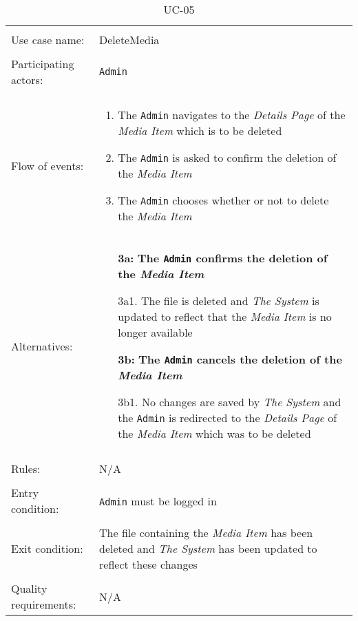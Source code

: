 \noindent
\begin{table}[h!]
\caption{UC-05}
\label{UC-05}
\centering
\begin{tabular}{ l  p{8cm} }
\hline                        
\\
Use case name:  & DeleteMedia   \\   \hline    
\\            
Participating actors:  & \texttt{Admin} \\   \hline   
\\             
Flow of events: & \begin{enumerate}
\item{The \texttt{Admin} navigates to the \textit{Details Page} of the \textit{Media Item} which is to be deleted}
\item{The \texttt{Admin} is asked to confirm the deletion of the \textit{Media Item}}
\item{The \texttt{Admin} chooses whether or not to delete the \textit{Media Item}}
\end{enumerate}
\\
Alternatives: & \begin{itemize}
\item[\textbf{3a:}]{\textbf{The \texttt{Admin} confirms the deletion of the \textit{Media Item}}}
\item[]  3a1. The file is deleted and \textit{The System} is updated to reflect that the \textit{Media Item} is no longer available
\item[\textbf{3b:}]{\textbf{The \texttt{Admin} cancels the deletion of the \textit{Media Item}}}
\item[]  3b1. No changes are saved by \textit{The System} and the \texttt{Admin} is redirected to the \textit{Details Page} of the \textit{Media Item} which was to be deleted
\end{itemize}
\\ \hline
\\
Rules: & N/A
\\   \hline 
\\
Entry condition: & \texttt{Admin} must be logged in \\ \hline
\\
Exit condition: & The file containing the \textit{Media Item} has been deleted and \textit{The System} has been updated to reflect these changes \\ \hline
\\
Quality requirements: & N/A \\ \hline  
\end{tabular}
\end{table}

